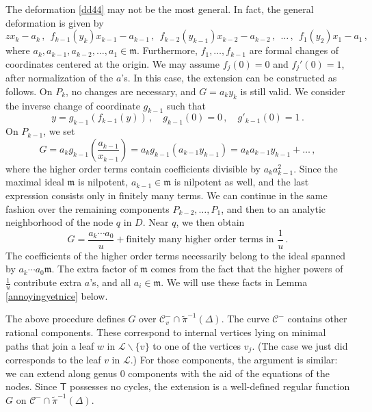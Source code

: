 \documentclass[11pt]{amsart}
\theoremstyle{definition}
\renewcommand{\tilde}{\widetilde}
\begin{document}
{The deformation \eqref{dd44} may not be the most general. In fact, the general deformation is given by \begin{equation} \label{dd45}
zx_k-a_k\, ,\ \  f_{k-1}(y_k)x_{k-1}-a_{k-1}\, ,\ \ f_{k-2}(y_{k-1})x_{k-2} - a_{k-2}\, , \ \ \ldots \, , \ \ 
f_1(y_2)x_1 - a_1\,, 
\end{equation}
where $a_k,a_{k-1},a_{k-2}, \ldots, a_1 \in \mathfrak m$. Furthermore, $f_1, \ldots, f_{k-1}$ are formal changes of coordinates centered at the origin. We may assume $f_j(0)=0$ and $f_j'(0)=1$, after normalization of the $a$'s. In this case, the extension can be constructed as follows. On $P_k$, no changes are necessary, and $G= {a_k}{y_k}$ is still valid. We consider the inverse change of coordinate $g_{k-1}$ such that $$y=g_{k-1}(f_{k-1}(y))\, , \quad g_{k-1}(0)=0\, , \quad g'_{k-1}(0)=1\, .$$ On $P_{k-1}$, we set $$G={a_k}g_{k-1}\left(\frac{a_{k-1}}{x_{k-1}}\right)=a_k g_{k-1}(a_{k-1} y_{k-1})=a_k a_{k-1} y_{k-1} +\ldots\, ,$$ where the higher order terms contain coefficients divisible by $a_k a_{k-1}^2$. Since the maximal ideal $\mathfrak m$ is nilpotent, $a_{k-1}\in \mathfrak m$ is nilpotent as well, and the last expression consists only in finitely many terms. We can continue in the same fashion over the remaining components $P_{k-2}, \ldots, P_1$, and then to an analytic neighborhood of the node $q$ in $D$. Near $q$, we then obtain \begin{equation}\label{formg}G=\frac{a_k\cdots a_0}{u}+\text{finitely many higher order terms in } \frac{1}{u}\,.\end{equation} The coefficients of the higher order terms necessarily belong to the ideal spanned by $a_k\cdots a_0 \mathfrak m$. The extra factor of $\mathfrak m$ comes from the fact that the higher powers of $\frac{1}{u}$ contribute extra $a$'s, and all $a_i\in \mathfrak m$. We will use these facts in Lemma \ref{annoyingyetnice} below.  

The above procedure defines $G$ over $\mathcal C_v^-\cap \tilde \pi^{-1}(\Delta)$. The curve ${\mathcal C}^{-}$ contains other rational components. These correspond to internal vertices lying on minimal paths that join a leaf $w$ in $\mathcal L\smallsetminus\{v\}$ to one of the vertices $v_j$. (The case we just did corresponds to the leaf $v$ in $\mathcal L$.) For those components, the argument is similar: we can extend along genus $0$ components with the aid of the equations of the nodes. Since $\mathsf{T}$ possesses no cycles, the extension is a well-defined regular function $G$ on ${\mathcal C}^{-}\cap \tilde \pi^{-1}(\Delta)$. 


}
\end{document}
